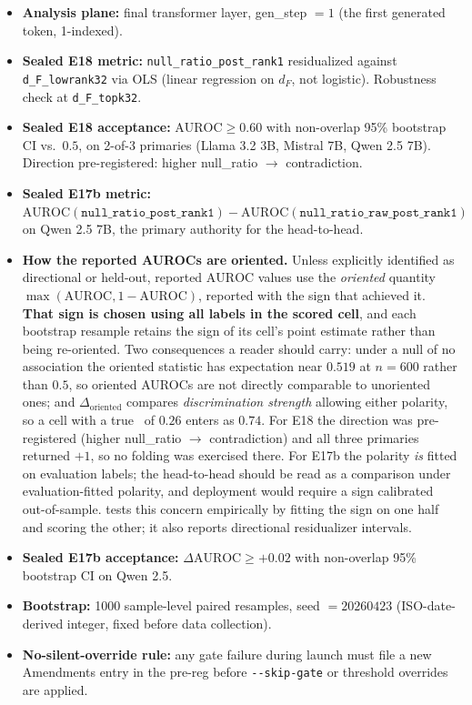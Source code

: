 \documentclass[10pt, letterpaper]{article}
\newcommand{\auroc}{\text{AUROC}}
\newcommand{\Doriented}{\Delta_{\text{oriented}}}
\begin{document}
\begin{itemize}[leftmargin=*, itemsep=2pt, topsep=2pt]
  \item \textbf{Analysis plane:} final transformer layer, gen\_step
  $= 1$ (the first generated token, 1-indexed).
  \item \textbf{Sealed E18 metric:} \texttt{null\_ratio\_post\_rank1}
  residualized against \texttt{d\_F\_lowrank32} via OLS (linear
  regression on $d_F$, not logistic). Robustness check at
  \texttt{d\_F\_topk32}.
  \item \textbf{Sealed E18 acceptance:} $\auroc \geq 0.60$ with
  non-overlap 95\% bootstrap CI vs.\ $0.5$, on 2-of-3 primaries (Llama
  3.2 3B, Mistral 7B, Qwen 2.5 7B). Direction pre-registered: higher
  null\_ratio $\to$ contradiction.
  \item \textbf{Sealed E17b metric:}
  $\auroc(\texttt{null\_ratio\_post\_rank1}) -
  \auroc(\texttt{null\_ratio\_raw\_post\_rank1})$ on Qwen 2.5 7B, the
  primary authority for the head-to-head.
  \item \textbf{How the reported AUROCs are oriented.} Unless explicitly
  identified as directional or held-out, reported $\auroc$ values use the
  \emph{oriented} quantity
  $\max(\auroc, 1-\auroc)$, reported with the sign that achieved it.
  \textbf{That sign is chosen using all labels in the scored cell},
  and each bootstrap resample retains the sign of its cell's point
  estimate rather than being re-oriented. Two consequences a reader
  should carry: under a null of no association the oriented statistic
  has expectation near $0.519$ at $n{=}600$ rather than $0.5$, so
  oriented AUROCs are not directly comparable to unoriented ones; and
  $\Doriented$ compares \emph{discrimination strength} allowing either
  polarity, so a cell with a true \auroc\ of $0.26$ enters as $0.74$.
  For E18 the direction was pre-registered (higher null\_ratio $\to$
  contradiction) and all three primaries returned $+1$, so no folding
  was exercised there. For E17b the polarity \emph{is} fitted on
  evaluation labels; the head-to-head should be read as a comparison
  under evaluation-fitted polarity, and deployment would require a
  sign calibrated out-of-sample.  tests this
  concern empirically by fitting the sign on one half and scoring the
  other; it also reports directional residualizer intervals.
  \item \textbf{Sealed E17b acceptance:} $\Delta \auroc \geq +0.02$
  with non-overlap 95\% bootstrap CI on Qwen 2.5.
  \item \textbf{Bootstrap:} 1000 sample-level paired resamples,
  seed $= 20260423$ (ISO-date-derived integer, fixed before data
  collection).
  \item \textbf{No-silent-override rule:} any gate failure during
  launch must file a new Amendments entry in the pre-reg before
  \texttt{-{}-skip-gate} or threshold overrides are applied.
\end{itemize}
\end{document}
